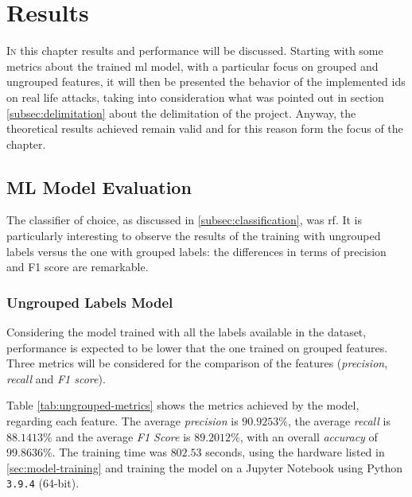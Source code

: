 \chapter{Results}
\label{chap:results}

\lettrine[lines=4, findent=3pt, nindent=0pt]{I}{n} this chapter results and performance will be discussed. Starting with some metrics about the trained \gls{ml} model, with a particular focus on grouped and ungrouped features, it will then be presented the behavior of the implemented \gls{ids} on real life attacks, taking into consideration what was pointed out in section \ref{subsec:delimitation} about the delimitation of the project. Anyway, the theoretical results achieved remain valid and for this reason form the focus of the chapter.

\section{ML Model Evaluation}
\label{sec:ml-model-evaluation}

The classifier of choice, as discussed in \ref{subsec:classification}, was \gls{rf}. It is particularly interesting to observe the results of the training with ungrouped labels versus the one with grouped labels: the differences in terms of precision and F1 score are remarkable.


\subsection{Ungrouped Labels Model}
\label{subsec:ungrouped-training}

Considering the model trained with all the labels available in the dataset, performance is expected to be lower that the one trained on grouped features. Three metrics will be considered for the comparison of the features (\textit{precision}, \textit{recall} and \textit{F1 score}).
\par Table \ref{tab:ungrouped-metrics} shows the metrics achieved by the model, regarding each feature. The average \textit{precision} is $90.9253\%$, the average \textit{recall} is $88.1413\%$ and the average \textit{F1 Score} is $89.2012\%$, with an overall \textit{accuracy} of $99.8636\%$. The training time was $802.53$ seconds, using the hardware listed in \ref{sec:model-training} and training the model on a Jupyter Notebook using Python \texttt{3.9.4} (64-bit).

